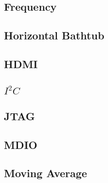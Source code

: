 \pagebreak
\subsection{Frequency}

\pagebreak
\subsection{Horizontal Bathtub}

\pagebreak
\subsection{HDMI}
\label{filter:hdmi}

\pagebreak
\subsection{$I^2C$}

\pagebreak
\subsection{JTAG}

\pagebreak
\subsection{MDIO}

\pagebreak
\subsection{Moving Average}

\pagebreak
